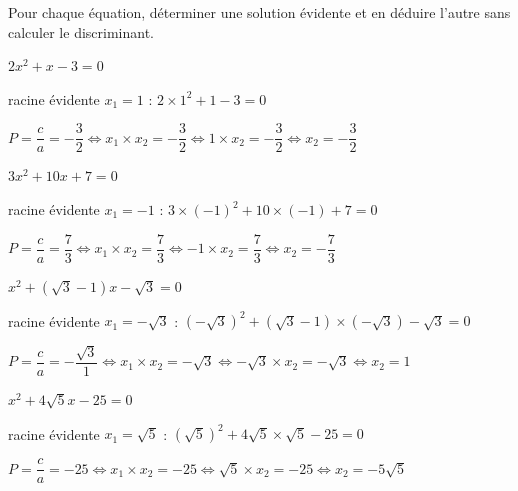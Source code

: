 \documentclass[11pt,a4paper]{article}  %
\begin{document}

Pour chaque équation, déterminer une solution évidente et en déduire l'autre sans calculer le discriminant.
\begin{enumMet}
	\item $2 x^2+x-3=0$
	\begin{corrBox}
		racine évidente $x_1=1$ : $2\times 1^2+1-3=0$
		
		$P = \dfrac{c}{a}=-\dfrac{3}{2} \iff x_1\times x_2=-\dfrac{3}{2} \iff 1\times x_2=-\dfrac{3}{2} \iff x_2=-\dfrac{3}{2}$		
	\end{corrBox}
	\item $3 x^2+10 x+7=0$
	\begin{corrBox}
		racine évidente $x_1=-1$ : $3\times (-1)^2+10\times (-1)+7=0$
		
		$P = \dfrac{c}{a}=\dfrac{7}{3} \iff x_1\times x_2=\dfrac{7}{3} \iff -1\times x_2=\dfrac{7}{3} \iff x_2=-\dfrac{7}{3}$
	\end{corrBox}
	\item $x^2+(\sqrt{3}-1) x-\sqrt{3}=0$
	\begin{corrBox}
		racine évidente $x_1=-\sqrt{3}$ : $(-\sqrt{3})^2+(\sqrt{3}-1)\times (-\sqrt{3})-\sqrt{3}=0$
		
		$P = \dfrac{c}{a}=-\dfrac{\sqrt{3}}{1} \iff x_1\times x_2=-\sqrt{3} \iff -\sqrt{3}\times x_2=-\sqrt{3} \iff x_2=1$		
	\end{corrBox}
	\item $x^2+4 \sqrt{5} x-25=0$
	\begin{corrBox}
		racine évidente $x_1=\sqrt{5}$ : $(\sqrt{5})^2+4 \sqrt{5}\times \sqrt{5}-25=0$
		
		$P = \dfrac{c}{a}=-25 \iff x_1\times x_2=-25 \iff \sqrt{5}\times x_2=-25 \iff x_2=-5\sqrt{5}$		
	\end{corrBox}
\end{enumMet}


\exercice{}
\end{document}
